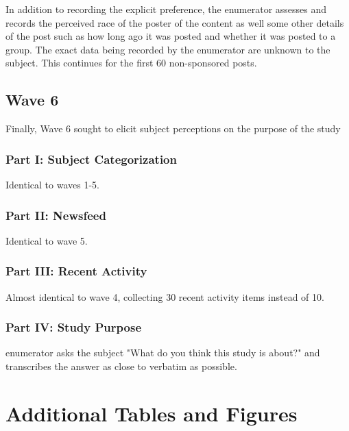 \documentclass[12pt,letterpaper]{article}
\begin{document}
In addition to recording the explicit preference, the enumerator assesses and records the perceived race of the poster of the content as well some other details of the post such as how long ago it was posted and whether it was posted to a group. The exact data being recorded by the enumerator are unknown to the subject. This continues for the first 60 non-sponsored posts.

\subsection{Wave 6}

Finally, Wave 6 sought to elicit subject perceptions on the purpose of the study 

\subsubsection{Part I: Subject Categorization} Identical to waves 1-5.

\subsubsection{Part II: Newsfeed}  Identical to wave 5.

\subsubsection{Part III: Recent Activity} Almost identical to wave 4, collecting 30 recent activity items instead of 10.

\subsubsection{Part IV: Study Purpose} enumerator asks the subject "What do you think this study is about?" and transcribes the answer as close to verbatim as possible.

\section{Additional Tables and Figures}\label{app:tab_fig}
\end{document}
